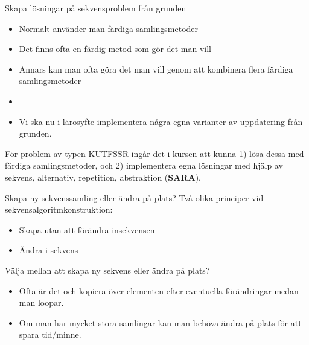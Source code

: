 

\begin{Slide}{Skapa lösningar på sekvensproblem från grunden}
  \begin{itemize}
    \item Normalt använder man färdiga samlingsmetoder
    \item Det finns ofta en färdig metod som gör det man vill
    \item Annars kan man ofta göra det man vill genom att kombinera flera färdiga samlingsmetoder
    \item[] \pause
    \item Vi ska nu i lärosyfte implementera några egna varianter av uppdatering från grunden.  
  \end{itemize}

{\SlideFontSmall  För problem av typen KUTFSSR ingår det i kursen att kunna 1) lösa dessa med färdiga samlingsmetoder, och 2) implementera egna lösningar med hjälp av sekvens, alternativ, repetition, abstraktion (\textbf{SARA}).
}
\end{Slide}

\begin{Slide}{Skapa ny sekvenssamling eller ändra på plats?}
Två olika principer vid sekvensalgoritmkonstruktion:
\begin{itemize}
\item Skapa  utan att förändra insekvensen
\item Ändra   i  sekvens
\end{itemize}
\pause
\vspace{1em}
Välja mellan att skapa ny sekvens eller ändra på plats?
\begin{itemize}
\item Ofta är det  och kopiera över elementen efter eventuella förändringar medan man loopar.
\item Om man har mycket stora samlingar kan man behöva ändra på plats för att spara tid/minne.
\end{itemize}
\end{Slide}

